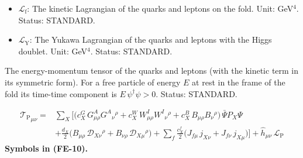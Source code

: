 \documentclass[
  10pt,
]{article}
\begin{document}
\begin{itemize}
  in the coordinates \(x_1, \dots, x_4\) (the induced metric at
  \(\sigma = 0\) without the extra times); \(\hat h^{\mu\nu}\) its
  inverse, \(\hat h\) its determinant,
  \(\sqrt{-\hat h} = \mathrm{e}^{3a_4}\); \(\hat h^{(1)}_{\mu\nu}\) its
  first-order cosmological perturbation. Unit: dimensionless. Status:
  DERIVED.
\item
  \(\mathcal{L}_{\mathrm{f}}\): The kinetic Lagrangian of the quarks and
  leptons on the fold. Unit: GeV\(^4\). Status: STANDARD.
\item
  \(\mathcal{L}_{\mathrm{Y}}\): The Yukawa Lagrangian of the quarks and
  leptons with the Higgs doublet. Unit: GeV\(^4\). Status: STANDARD.
\end{itemize}

The energy-momentum tensor of the quarks and leptons (with the kinetic
term in its symmetric form). For a free particle of energy \(E\) at rest
in the frame of the fold its time-time component is
\(E\,\psi^\dagger\psi > 0\). Status: STANDARD.

\[
\begin{aligned}
{\mathcal{T}_{\mathrm{P}}}_{\mu\nu} = {}&\sum_X\Big[\big(c^{G}_X\,G^A_{\mu\rho}G^A{}_\nu{}^\rho + c^{W}_X\,W^I_{\mu\rho}W^I{}_\nu{}^\rho
 + c^{B}_X\,B_{\mu\rho}B_\nu{}^\rho\big)\,\bar\Psi P_X\Psi\\
&+ \frac{d_X}{2}\big(B_{\mu\rho}\,\mathcal{D}_{X\nu}{}^\rho + B_{\nu\rho}\,\mathcal{D}_{X\mu}{}^\rho\big)
 + \sum_f\frac{c^{f}_X}{2}\big(J_{f\mu}\,j_{X\nu} + J_{f\nu}\,j_{X\mu}\big)\Big] + \hat h_{\mu\nu}\,\mathcal{L}_{\mathrm{P}}
\end{aligned} \tag{FE-10}
\] \textbf{Symbols in (FE-10).}
\end{document}
